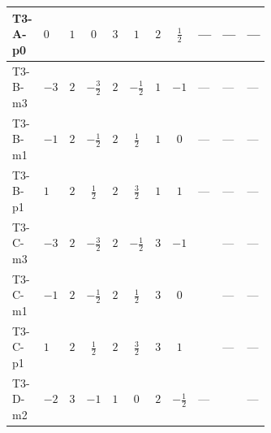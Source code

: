 \documentclass[8pt]{article}
\begin{document}
\begin{landscape}
\begin{longtable}{@{}llcccccc >{\raggedright\arraybackslash}p{0.21\linewidth} >{\raggedright\arraybackslash}p{0.21\linewidth} >{\raggedright\arraybackslash}p{0.21\linewidth}@{}}
\midrule
T3-A-p0 & $0$ & $1$ & $0$ & $3$ & $1$ & $2$ & $\frac{1}{2}$ & --- & --- & --- \\
\midrule
T3-B-m3 & $-3$ & $2$ & $-\frac{3}{2}$ & $2$ & $-\frac{1}{2}$ & $1$ & $-1$ & --- & --- & --- \\
\midrule
T3-B-m1 & $-1$ & $2$ & $-\frac{1}{2}$ & $2$ & $\frac{1}{2}$ & $1$ & $0$ & --- & --- & --- \\
\midrule
T3-B-p1 & $1$ & $2$ & $\frac{1}{2}$ & $2$ & $\frac{3}{2}$ & $1$ & $1$ & --- & --- & --- \\
\midrule
T3-C-m3 & $-3$ & $2$ & $-\frac{3}{2}$ & $2$ & $-\frac{1}{2}$ & $3$ & $-1$ & \scriptsize\adjustbox{max width=\linewidth}{$\begin{gathered} {\lambda_5} \left(\frac{3}{2} T_{\nu}^{(1)}+\frac{3}{2} T_{\nu}^{(2)}+6 \operatorname{Tr}\!\left({Y_d}\,\left({Y_d}\right)^{\dagger}\right)+2 \operatorname{Tr}\!\left({Y_e}\,\left({Y_e}\right)^{\dagger}\right)+6 \operatorname{Tr}\!\left({Y_u}\,\left({Y_u}\right)^{\dagger}\right)+\frac{{\lambda_{12}^{(A)}}}{6}+\frac{2 {\lambda_{HS_1}^{(A)}}}{3}+2 {\lambda_{HS_2}^{(A)}}\right)\end{gathered}$} & --- & --- \\
\midrule
T3-C-m1 & $-1$ & $2$ & $-\frac{1}{2}$ & $2$ & $\frac{1}{2}$ & $3$ & $0$ & \scriptsize\adjustbox{max width=\linewidth}{$\begin{gathered} {\lambda_5} \left(\frac{3}{2} T_{\nu}^{(1)}+\frac{3}{2} T_{\nu}^{(2)}+6 \operatorname{Tr}\!\left({Y_d}\,\left({Y_d}\right)^{\dagger}\right)+2 \operatorname{Tr}\!\left({Y_e}\,\left({Y_e}\right)^{\dagger}\right)+6 \operatorname{Tr}\!\left({Y_u}\,\left({Y_u}\right)^{\dagger}\right)+\frac{{\lambda_{12}^{(A)}}}{6}+\frac{2 {\lambda_{HS_1}^{(A)}}}{3}+2 {\lambda_{HS_2}^{(A)}}\right)\end{gathered}$} & --- & --- \\
\midrule
T3-C-p1 & $1$ & $2$ & $\frac{1}{2}$ & $2$ & $\frac{3}{2}$ & $3$ & $1$ & \scriptsize\adjustbox{max width=\linewidth}{$\begin{gathered} {\lambda_5} \left(\frac{3}{2} T_{\nu}^{(1)}+\frac{3}{2} T_{\nu}^{(2)}+6 \operatorname{Tr}\!\left({Y_d}\,\left({Y_d}\right)^{\dagger}\right)+2 \operatorname{Tr}\!\left({Y_e}\,\left({Y_e}\right)^{\dagger}\right)+6 \operatorname{Tr}\!\left({Y_u}\,\left({Y_u}\right)^{\dagger}\right)+\frac{{\lambda_{12}^{(A)}}}{6}+\frac{2 {\lambda_{HS_1}^{(A)}}}{3}+2 {\lambda_{HS_2}^{(A)}}\right)\end{gathered}$} & --- & --- \\
\midrule
T3-D-m2 & $-2$ & $3$ & $-1$ & $1$ & $0$ & $2$ & $-\frac{1}{2}$ & --- & \scriptsize\adjustbox{max width=\linewidth}{$\begin{gathered} {\lambda_5} (T_{\nu}^{(1)}+2 T_{\nu}^{(2)}+6 \operatorname{Tr}\!\left({Y_d}\,\left({Y_d}\right)^{\dagger}\right)+2 \operatorname{Tr}\!\left({Y_e}\,\left({Y_e}\right)^{\dagger}\right)+6 \operatorname{Tr}\!\left({Y_u}\,\left({Y_u}\right)^{\dagger}\right)-4 {\lambda_{HS_1}^{(A)}})\end{gathered}$} & --- \\

\end{longtable}
\end{landscape}
\end{document}
